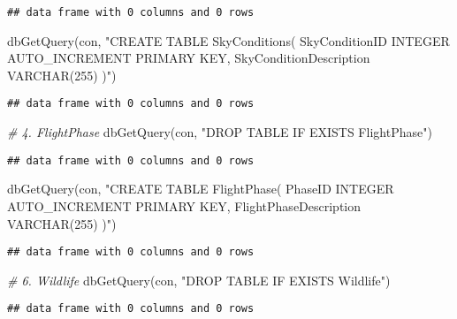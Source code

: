 \documentclass[
]{article}
\newenvironment{Shaded}{\begin{snugshade}}{\end{snugshade}}
\newcommand{\CommentTok}[1]{\textcolor[rgb]{0.56,0.35,0.01}{\textit{#1}}}
\newcommand{\FunctionTok}[1]{\textcolor[rgb]{0.00,0.00,0.00}{#1}}
\newcommand{\NormalTok}[1]{#1}
\newcommand{\StringTok}[1]{\textcolor[rgb]{0.31,0.60,0.02}{#1}}
\begin{document}
\begin{verbatim}
## data frame with 0 columns and 0 rows
\end{verbatim}

\begin{Shaded}
\begin{Highlighting}[]
\FunctionTok{dbGetQuery}\NormalTok{(con, }\StringTok{"CREATE TABLE SkyConditions(}
\StringTok{    SkyConditionID INTEGER AUTO\_INCREMENT PRIMARY KEY,}
\StringTok{    SkyConditionDescription VARCHAR(255)}
\StringTok{)"}\NormalTok{)}
\end{Highlighting}
\end{Shaded}

\begin{verbatim}
## data frame with 0 columns and 0 rows
\end{verbatim}

\begin{Shaded}
\begin{Highlighting}[]
\CommentTok{\# 4. FlightPhase}
\FunctionTok{dbGetQuery}\NormalTok{(con, }\StringTok{"DROP TABLE IF EXISTS FlightPhase"}\NormalTok{)}
\end{Highlighting}
\end{Shaded}

\begin{verbatim}
## data frame with 0 columns and 0 rows
\end{verbatim}

\begin{Shaded}
\begin{Highlighting}[]
\FunctionTok{dbGetQuery}\NormalTok{(con, }\StringTok{"CREATE TABLE FlightPhase(}
\StringTok{    PhaseID INTEGER AUTO\_INCREMENT PRIMARY KEY,}
\StringTok{    FlightPhaseDescription VARCHAR(255)}
\StringTok{)"}\NormalTok{)}
\end{Highlighting}
\end{Shaded}

\begin{verbatim}
## data frame with 0 columns and 0 rows
\end{verbatim}

\begin{Shaded}
\begin{Highlighting}[]
\CommentTok{\# 6. Wildlife}
\FunctionTok{dbGetQuery}\NormalTok{(con, }\StringTok{"DROP TABLE IF EXISTS Wildlife"}\NormalTok{)}
\end{Highlighting}
\end{Shaded}

\begin{verbatim}
## data frame with 0 columns and 0 rows
\end{verbatim}
\end{document}
